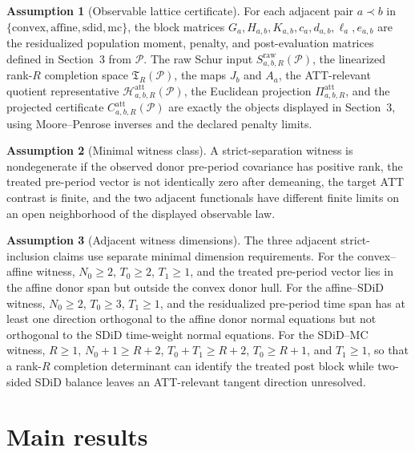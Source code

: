 \documentclass[11pt]{article}
\newcommand{\calH}{\mathcal{H}}
\theoremstyle{definition}
\newtheorem{assumption}{Assumption}
\theoremstyle{plain}
\theoremstyle{remark}
\begin{document}
\begin{assumption}[Observable lattice certificate]\label{ass:lattice-certificate}
For each adjacent pair \(a\prec b\) in \(\{\mathrm{convex},\mathrm{affine},\mathrm{sdid},\mathrm{mc}\}\), the block matrices \(G_a,H_{a,b},K_{a,b},c_a,d_{a,b},\ell_a,e_{a,b}\) are the residualized population moment, penalty, and post-evaluation matrices defined in Section~3 from \(\mathcal P\). The raw Schur input \(S^{\mathrm{raw}}_{a,b,R}(\mathcal P)\), the linearized rank-\(R\) completion space \(\mathfrak T_R(\mathcal P)\), the maps \(J_b\) and \(A_a\), the ATT-relevant quotient representative \(\calH^{\mathrm{att}}_{a,b,R}(\mathcal P)\), the Euclidean projection \(\Pi^{\mathrm{att}}_{a,b,R}\), and the projected certificate \(C^{\mathrm{att}}_{a,b,R}(\mathcal P)\) are exactly the objects displayed in Section~3, using Moore--Penrose inverses and the declared penalty limits.
\end{assumption}

\begin{assumption}[Minimal witness class]\label{ass:minimal-witness}
A strict-separation witness is nondegenerate if the observed donor pre-period covariance has positive rank, the treated pre-period vector is not identically zero after demeaning, the target ATT contrast is finite, and the two adjacent functionals have different finite limits on an open neighborhood of the displayed observable law.
\end{assumption}

\begin{assumption}[Adjacent witness dimensions]\label{ass:adjacent-witness-dimensions}
The three adjacent strict-inclusion claims use separate minimal dimension requirements. For the convex--affine witness, \(N_0\ge2\), \(T_0\ge2\), \(T_1\ge1\), and the treated pre-period vector lies in the affine donor span but outside the convex donor hull. For the affine--SDiD witness, \(N_0\ge2\), \(T_0\ge3\), \(T_1\ge1\), and the residualized pre-period time span has at least one direction orthogonal to the affine donor normal equations but not orthogonal to the SDiD time-weight normal equations. For the SDiD--MC witness, \(R\ge1\), \(N_0+1\ge R+2\), \(T_0+T_1\ge R+2\), \(T_0\ge R+1\), and \(T_1\ge1\), so that a rank-\(R\) completion determinant can identify the treated post block while two-sided SDiD balance leaves an ATT-relevant tangent direction unresolved.
\end{assumption}

\section{Main results}
\end{document}
